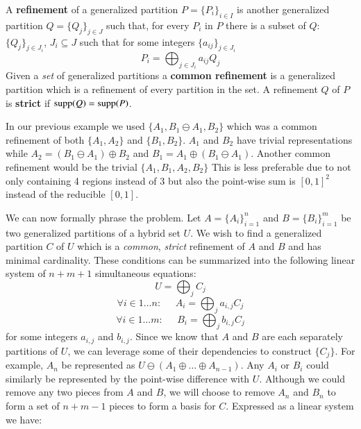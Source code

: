 \begin{definition}
	A \textbf{refinement} of a generalized partition $P = \{P_i\}_{i \in I}$ is another generalized partition
	$Q = \{Q_j \}_{j \in J}$ such that, for every $P_i$ in $P$ there is a subset of $Q$: $\{ Q_{j} \}_{j \in J_i}$, 
	$J_i \subseteq J$ such that for some integers $\{a_{ij}\}_{j \in J_i}$
	\begin{equation}
		P_i = \bigoplus_{j \in J_i} a_{ij} Q_{j}
	\end{equation}
	Given a \emph{set} of generalized partitions a \textbf{common refinement} is a generalized partition which is a 
	refinement of every partition in the set. 
	A refinement $Q$ of $P$ is \textbf{strict} if $\text{supp}(Q) = \text{supp}(P)$.
\end{definition}


In our previous example we used $\{ A_1, B_1 \ominus A_1, B_2 \}$ which was a common refinement of both
$\{ A_1, A_2 \}$ and $\{ B_1, B_2 \}$.
$A_1$ and $B_2$ have trivial representations while $A_2 = (B_1 \ominus A_1) \oplus B_2$ and 
$B_1 = A_1 \oplus (B_1 \ominus A_1)$.
Another common refinement would be the trivial $\{ A_1, B_1, A_2, B_2 \}$
This is less preferable due to not only containing 4 regions instead of 3 but also the point-wise sum is $[0,1]^2$
instead of the reducible $[0,1]$.


We can now formally phrase the problem.
Let $A=\{ A_i \}_{i=1}^n$ and $B=\{ B_i \}_{i =1}^m$ be two generalized partitions of a hybrid set $U$.
We wish to find a generalized partition $C$  of $U$ which is a \emph{common}, \emph{strict} refinement of $A$ and $B$
and has minimal cardinality.
These conditions can be summarized into the following linear system of $n+m+1$ simultaneous equations:
\begin{equation*}
	U = \bigoplus_j C_j
\end{equation*}
\begin{equation*}
	\forall i \in 1 \ldots n : \;\;\;\;\; A_i = \bigoplus_{j}  a_{i,j} C_j
\end{equation*}
\begin{equation*}
	\forall i \in 1 \ldots m : \;\;\;\;\; B_i = \bigoplus_{j} b_{i,j} C_j
\end{equation*}
for some integers $a_{i,j}$ and $b_{i,j}$.
Since we know that $A$ and $B$ are each separately partitions of $U$, 
we can leverage some of their dependencies to construct $\{C_j\}$.
For example, $A_n$ be represented as $U \ominus ( A_1 \oplus \ldots \oplus A_{n-1} )$.
Any $A_i$ or $B_i$ could similarly be represented by the point-wise difference with $U$.
Although we could remove any two pieces from $A$ and $B$, we will choose to remove $A_n$ and $B_n$ to form a set of
$n+m-1$ pieces to form a basis for $C$.
Expressed as a linear system we have:


